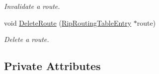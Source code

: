 \begin{DoxyCompactItemize}
\begin{DoxyCompactList}\small\item\em Invalidate a route. \end{DoxyCompactList}\item 
void \hyperlink{classns3_1_1Rip_a4613413ac628e8313c26d5ea6ed99761}{Delete\+Route} (\hyperlink{classns3_1_1RipRoutingTableEntry}{Rip\+Routing\+Table\+Entry} $\ast$route)
\begin{DoxyCompactList}\small\item\em Delete a route. \end{DoxyCompactList}\end{DoxyCompactItemize}
\subsection*{Private Attributes}
